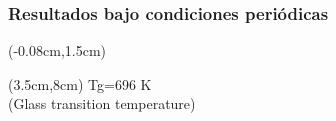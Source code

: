 \begin{frame}
    \frametitle{Resultados bajo condiciones peri\'odicas}
    \begin{textblock*}{12.6cm}(-0.08cm,1.5cm) 
      \begin{figure}[htp]
	\centering
      \end{figure}
    \end{textblock*}
    \begin{textblock*}{6cm}(3.5cm,8cm) 
    \centering
      Tg=696 K\\
      (Glass transition temperature)
    \end{textblock*}
\end{frame}

